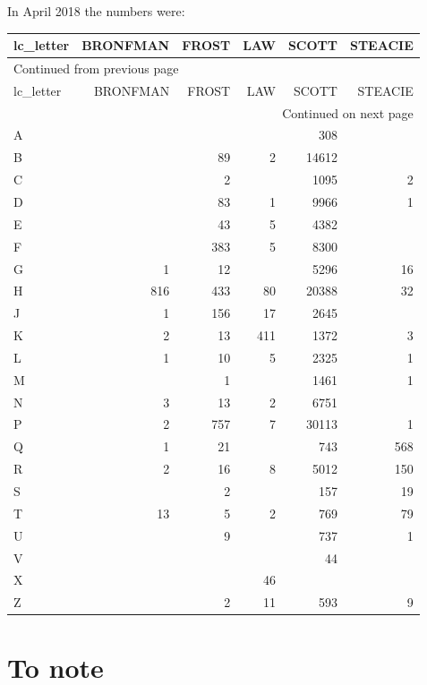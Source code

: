 \documentclass[11pt]{article}
\begin{document}
In April 2018 the numbers were:

\begin{longtable}{lrrrrr}
lc\_letter & BRONFMAN & FROST & LAW & SCOTT & STEACIE\\
\hline
\endfirsthead
\multicolumn{6}{l}{Continued from previous page} \\
\hline

lc\_letter & BRONFMAN & FROST & LAW & SCOTT & STEACIE \\

\hline
\endhead
\hline\multicolumn{6}{r}{Continued on next page} \\
\endfoot
\endlastfoot
\hline
A &  &  &  & 308 & \\
B &  & 89 & 2 & 14612 & \\
C &  & 2 &  & 1095 & 2\\
D &  & 83 & 1 & 9966 & 1\\
E &  & 43 & 5 & 4382 & \\
F &  & 383 & 5 & 8300 & \\
G & 1 & 12 &  & 5296 & 16\\
H & 816 & 433 & 80 & 20388 & 32\\
J & 1 & 156 & 17 & 2645 & \\
K & 2 & 13 & 411 & 1372 & 3\\
L & 1 & 10 & 5 & 2325 & 1\\
M &  & 1 &  & 1461 & 1\\
N & 3 & 13 & 2 & 6751 & \\
P & 2 & 757 & 7 & 30113 & 1\\
Q & 1 & 21 &  & 743 & 568\\
R & 2 & 16 & 8 & 5012 & 150\\
S &  & 2 &  & 157 & 19\\
T & 13 & 5 & 2 & 769 & 79\\
U &  & 9 &  & 737 & 1\\
V &  &  &  & 44 & \\
X &  &  & 46 &  & \\
Z &  & 2 & 11 & 593 & 9\\
\end{longtable}

\section*{To note}
\label{sec:orgbe1dab1}
\end{document}
